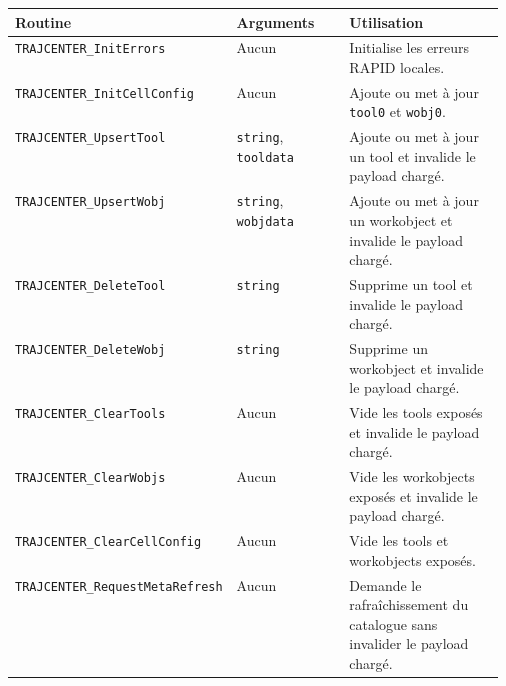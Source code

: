 \documentclass{rapportENSAM}
\begin{document}
\begin{table}[ht]
    \centering
    \small
    \begin{tabularx}{\linewidth}{
        |p{0.34\linewidth}
        |p{0.23\linewidth}
        |X|
    }
        \hline
        \textbf{Routine} &
        \textbf{Arguments} &
        \textbf{Utilisation} \\
        \hline

        \texttt{TRAJCENTER\_InitErrors} &
        Aucun &
        Initialise les erreurs RAPID locales. \\
        \hline

        \texttt{TRAJCENTER\_InitCellConfig} &
        Aucun &
        Ajoute ou met à jour \texttt{tool0} et \texttt{wobj0}. \\
        \hline

        \texttt{TRAJCENTER\_UpsertTool} &
        \texttt{string}, \texttt{tooldata} &
        Ajoute ou met à jour un tool et invalide le payload chargé. \\
        \hline

        \texttt{TRAJCENTER\_UpsertWobj} &
        \texttt{string}, \texttt{wobjdata} &
        Ajoute ou met à jour un workobject et invalide le payload chargé. \\
        \hline

        \texttt{TRAJCENTER\_DeleteTool} &
        \texttt{string} &
        Supprime un tool et invalide le payload chargé. \\
        \hline

        \texttt{TRAJCENTER\_DeleteWobj} &
        \texttt{string} &
        Supprime un workobject et invalide le payload chargé. \\
        \hline

        \texttt{TRAJCENTER\_ClearTools} &
        Aucun &
        Vide les tools exposés et invalide le payload chargé. \\
        \hline

        \texttt{TRAJCENTER\_ClearWobjs} &
        Aucun &
        Vide les workobjects exposés et invalide le payload chargé. \\
        \hline

        \texttt{TRAJCENTER\_ClearCellConfig} &
        Aucun &
        Vide les tools et workobjects exposés. \\
        \hline

        \texttt{TRAJCENTER\_RequestMetaRefresh} &
        Aucun &
        Demande le rafraîchissement du catalogue sans invalider le payload
        chargé. \\
        \hline


\end{tabularx}
\end{table}
\end{document}
